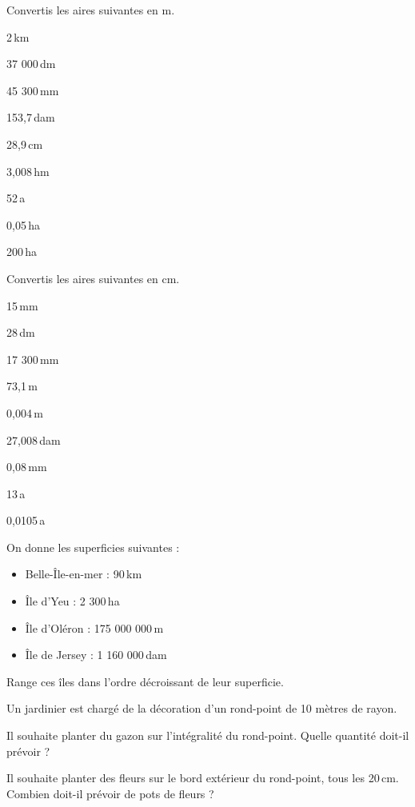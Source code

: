 \begin{exercice}[]
Convertis les aires suivantes en m.

\begin{colenumerate}{3} 
\item 2\,km
\item 37 000\,dm
\item 45 300\,mm
\item 153,7\,dam
\item 28,9\,cm
\item 3,008\,hm
\item 52\,a
\item 0,05\,ha
\item 200\,ha
\end{colenumerate} 
\end{exercice}


\begin{exercice}[]
Convertis les aires suivantes en cm.

\begin{colenumerate}{3} 
\item 15\,mm
\item 28\,dm
\item 17 300\,mm
\item 73,1\,m
\item 0,004\,m
\item 27,008\,dam
\item 0,08\,mm
\item 13\,a
\item 0,0105\,a
\end{colenumerate} 
 
\end{exercice}

\begin{exercice}[]
On  donne les superficies suivantes :
\begin{itemize}
    \item Belle-Île-en-mer : 90\,km
    \item Île d’Yeu : 2 300\,ha
    \item Île d’Oléron : 175 000 000\,m
    \item Île de Jersey : 1 160 000\,dam
\end{itemize}

Range ces îles dans l’ordre décroissant de leur superficie.   
\end{exercice}

\begin{exercice}[]
Un jardinier est chargé de la décoration d'un rond-point de 10 mètres de rayon.

\begin{colenumerate}{1} 
\item Il souhaite planter du gazon sur l'intégralité du rond-point. Quelle quantité doit-il prévoir ?
\item Il souhaite planter des fleurs sur le bord extérieur du rond-point, tous les 20\,cm. Combien doit-il prévoir de pots de fleurs ?
\end{colenumerate} 
\end{exercice}



